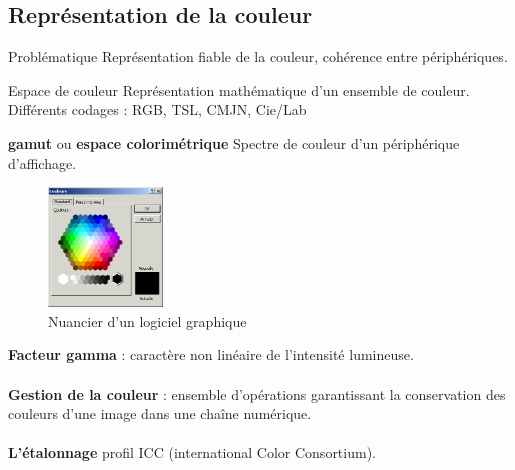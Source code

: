 \documentclass[14pt]{beamer}
\begin{document}
\subsection{Représentation de la couleur}
\begin{frame}{\subsecname}
    \begin{alertblock}{Problématique}
        Représentation fiable de la couleur, cohérence entre périphériques.\\
    \end{alertblock}
    \vfill
    \begin{block}{Espace de couleur}
        Représentation mathématique d'un ensemble de couleur.\\
        Différents codages : RGB, TSL, CMJN, Cie/Lab
    \end{block}
\end{frame}


\begin{frame}[allowframebreaks]{\subsecname}
\begin{block}{\textbf{gamut} ou \textbf{espace colorimétrique}} 
    Spectre de couleur d'un périphérique d'affichage.
\end{block}

\begin{figure}
    \centering
    \includegraphics[height=120px]{image_nuancier}
    \caption{Nuancier d'un logiciel graphique}
\end{figure}

\end{frame}


\begin{frame}{\subsecname}
\textbf{Facteur gamma} : caractère non linéaire de l'intensité lumineuse.
\\~\\
\textbf{Gestion de la couleur} : ensemble d'opérations garantissant la conservation des couleurs d'une image dans une chaîne numérique.
\\~\\
\textbf{L'étalonnage} profil ICC (international Color Consortium). \\
\end{frame}
\end{document}
